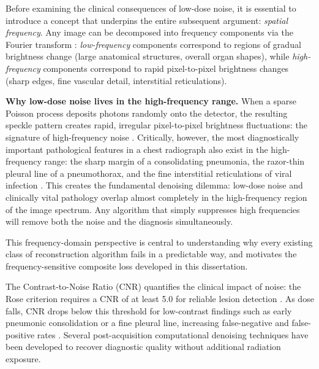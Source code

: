 \documentclass[12pt, a4paper, twoside, openright]{book}
\begin{document}
Before examining the clinical consequences of low-dose noise, it is essential to introduce a concept that underpins the entire subsequent argument: \textit{spatial frequency}. Any image can be decomposed into frequency components via the Fourier transform \cite{rahaman_spectral_2019}: \textit{low-frequency} components correspond to regions of gradual brightness change (large anatomical structures, overall organ shapes), while \textit{high-frequency} components correspond to rapid pixel-to-pixel brightness changes (sharp edges, fine vascular detail, interstitial reticulations).

\textbf{Why low-dose noise lives in the high-frequency range.} When a sparse Poisson process deposits photons randomly onto the detector, the resulting speckle pattern creates rapid, irregular pixel-to-pixel brightness fluctuations: the signature of high-frequency noise \cite{foi_practical_2008}. Critically, however, the most diagnostically important pathological features in a chest radiograph also exist in the high-frequency range: the sharp margin of a consolidating pneumonia, the razor-thin pleural line of a pneumothorax, and the fine interstitial reticulations of viral infection \cite{wang_high-frequency_2020}. This creates the fundamental denoising dilemma: low-dose noise and clinically vital pathology overlap almost completely in the high-frequency region of the image spectrum. Any algorithm that simply suppresses high frequencies will remove both the noise and the diagnosis simultaneously.

This frequency-domain perspective is central to understanding why every existing class of reconstruction algorithm fails in a predictable way, and motivates the frequency-sensitive composite loss developed in this dissertation.


The Contrast-to-Noise Ratio (CNR) quantifies the clinical impact of noise: the Rose criterion requires a CNR of at least 5.0 for reliable lesion detection \cite{rose_sensitivity_1948}. As dose falls, CNR drops below this threshold for low-contrast findings such as early pneumonic consolidation or a fine pleural line, increasing false-negative and false-positive rates \cite{bhadra_hallucinations_2021}. Several post-acquisition computational denoising techniques have been developed to recover diagnostic quality without additional radiation exposure.
\end{document}

